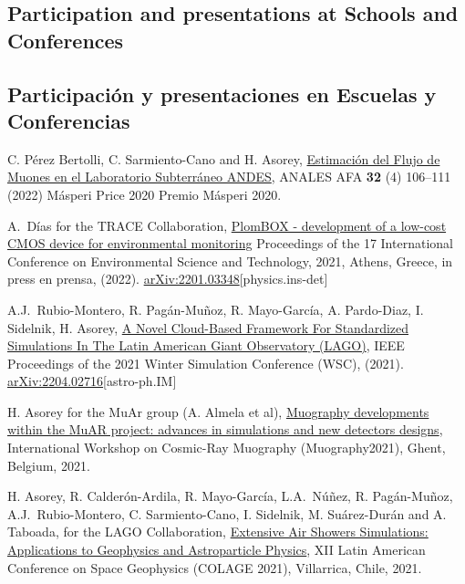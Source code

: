 \ifeng
\subsection*{Participation and presentations at Schools and Conferences}
\else
\subsection*{Participación y presentaciones en Escuelas y Conferencias}
\fi
\noindent
\begin{etaremune}

\item {} C. Pérez Bertolli, C. Sarmiento-Cano and H. Asorey, \href{https://afan.df.uba.ar/journal/index.php/analesafa/article/view/2300}{Estimación del Flujo de Muones en el Laboratorio Subterráneo ANDES}, ANALES AFA {\textbf{32}} (4) 106--111 (2022) \ifeng Másperi Price 2020 \else Premio Másperi 2020\fi.

\item {} A.\ Días for the TRACE Collaboration, \href{}{PlomBOX - development of a low-cost CMOS device for environmental monitoring} \en Proceedings of the 17 International Conference on Environmental Science and Technology, 2021, Athens, Greece, \ifeng in press \else en prensa\fi, (2022). \href{http://arxiv.org/abs/2201.03348}{arXiv:2201.03348}[physics.ins-det]

\item {} A.J.\ Rubio-Montero, R. Pagán-Muñoz, R. Mayo-García, A. Pardo-Diaz, I. Sidelnik, H. Asorey, \href{https://doi.org/10.1109/WSC52266.2021.9715360}{A Novel Cloud-Based Framework For Standardized Simulations In The Latin American Giant Observatory (LAGO)}, \en IEEE Proceedings of the 2021 Winter Simulation Conference (WSC), (2021). \href{http://arxiv.org/abs/2204.02716}{arXiv:2204.02716}[astro-ph.IM]

\item {} H. Asorey for the MuAr group (A. Almela et al), \href{https://indico.cern.ch/event/1033631/contributions/4530674/}{Muography developments within the MuAR project: advances in simulations and new detectors designs}, \en International Workshop on Cosmic-Ray Muography (Muography2021), Ghent, Belgium, 2021.

\item {} H. Asorey, R. Calderón-Ardila, R. Mayo-García, L.A.\ Núñez, R. Pagán-Muñoz, A.J.\ Rubio-Montero, C. Sarmiento-Cano, I. Sidelnik, M. Suárez-Durán and A. Taboada, for the LAGO Collaboration, \href{https://ccc.ciencias.uchile.cl/2021colage/abstracts/Hern%C3%A1n%20Asorey.pdf}{Extensive Air Showers Simulations: Applications to Geophysics and Astroparticle Physics}, \en XII Latin American Conference on Space Geophysics (COLAGE 2021), Villarrica, Chile, 2021.


\end{etaremune}
